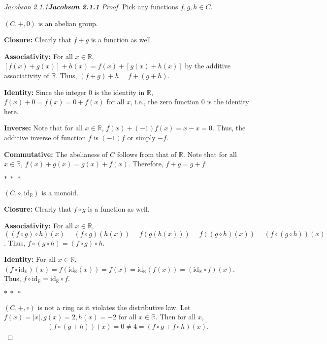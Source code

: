 \documentclass[12pt]{article}
\newenvironment{fproof}[1][]
  {\begin{proof}[\ifx\relax#1\relax\else\textbf{\large #1} Proof\fi]}
  {\end{proof}}
\newcommand{\abs}[1]{\left\lvert #1 \right\rvert}
\begin{document}
\begin{fproof}[Jacobson 2.1.1]
  Pick any functions \(f,g,h \in C\).

  \((C, +, 0)\) is an abelian group. 

  \textbf{Closure:}
  Clearly that \(f+g\) is a function as well.

  \textbf{Associativity:}
  For all \(x \in \mathbb{R}\),
  \([f(x) + g(x)] + h(x) = f(x) + [g(x) + h(x)]\) by the additive associativity of \(\mathbb{R}\). Thus, \((f + g) + h = f + (g + h)\).

  \textbf{Identity:}
  Since the integer 0 is the identity in \(\mathbb{R}\), \(f(x) + 0 = f(x) = 0 + f(x)\) for all \(x\), i.e., the zero function 0 is the identity here.

  \textbf{Inverse:}
  Note that for all \(x \in \mathbb{R}\), \(f(x) + (-1)f(x) = x - x = 0\). Thus, the additive inverse of function \(f\) is \((-1)f\) or simply \(-f\).

  \textbf{Commutative:}
  The abelianess of \(C\) follows from that of \(\mathbb{R}\). Note that for all \(x \in \mathbb{R}\), \(f(x) + g(x) = g(x) + f(x)\). Therefore, \(f + g = g + f\).

  \begin{center}
    \(\ast~\ast~\ast\)
  \end{center}

  \((C, \circ, \text{id}_{\mathbb{R}})\) is a monoid.

  \textbf{Closure:}
  Clearly that \(f \circ g\) is a function as well.

  \textbf{Associativity:}
  For all \(x \in \mathbb{R}\),
  \(((f \circ g) \circ h) (x)= (f \circ g)(h(x)) = f(g(h(x))) = f((g \circ h) (x)) = (f \circ (g \circ h)) (x)\).
  Thus, \(f \circ (g \circ h) = (f \circ g) \circ h\).

  \textbf{Identity:}
  For all \(x \in \mathbb{R}\), \((f \circ \text{id}_{\mathbb{R}}) (x) = f(\text{id}_{\mathbb{R}}(x)) = f(x) = \text{id}_{\mathbb{R}}(f(x)) = (\text{id}_{\mathbb{R}} \circ f)(x)\). Thus, \(f \circ \text{id}_{\mathbb{R}} = \text{id}_{\mathbb{R}} \circ f\).

  \begin{center}
    \(\ast~\ast~\ast\)
  \end{center}

  \((C, +, \circ)\) is not a ring as it violates the distributive law.
  Let \(f(x) = \abs{x}, g(x) = 2, h(x) = -2\) for all \(x \in \mathbb{R}\).
  Then for all \(x\),
  \begin{align*}
    (f \circ (g + h))(x) = 0 \neq 4 = (f \circ g + f \circ h)(x).
  \end{align*}




\end{fproof}
\end{document}
